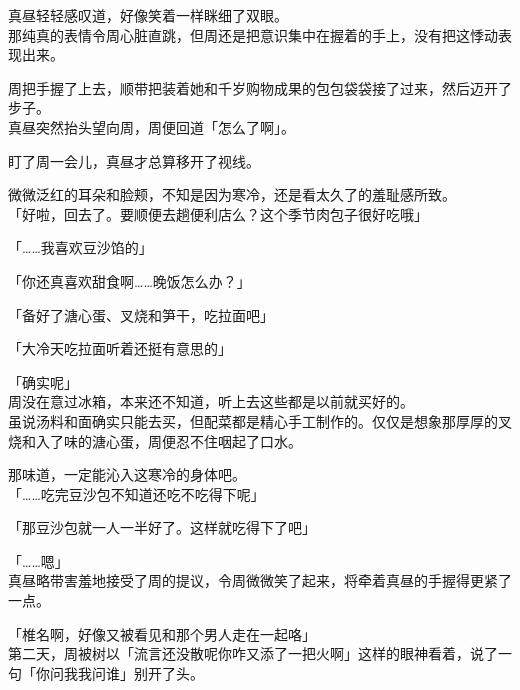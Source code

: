 真昼轻轻感叹道，好像笑着一样眯细了双眼。\\

那纯真的表情令周心脏直跳，但周还是把意识集中在握着的手上，没有把这悸动表现出来。

周把手握了上去，顺带把装着她和千岁购物成果的包包袋袋接了过来，然后迈开了步子。\\

真昼突然抬头望向周，周便回道「怎么了啊」。

盯了周一会儿，真昼才总算移开了视线。

微微泛红的耳朵和脸颊，不知是因为寒冷，还是看太久了的羞耻感所致。\\

「好啦，回去了。要顺便去趟便利店么？这个季节肉包子很好吃哦」

「……我喜欢豆沙馅的」

「你还真喜欢甜食啊……晚饭怎么办？」

「备好了溏心蛋、叉烧和笋干，吃拉面吧」

「大冷天吃拉面听着还挺有意思的」

「确实呢」\\

周没在意过冰箱，本来还不知道，听上去这些都是以前就买好的。\\

虽说汤料和面确实只能去买，但配菜都是精心手工制作的。仅仅是想象那厚厚的叉烧和入了味的溏心蛋，周便忍不住咽起了口水。

那味道，一定能沁入这寒冷的身体吧。\\

「……吃完豆沙包不知道还吃不吃得下呢」

「那豆沙包就一人一半好了。这样就吃得下了吧」

「……嗯」\\

真昼略带害羞地接受了周的提议，令周微微笑了起来，将牵着真昼的手握得更紧了一点。\\

\vspace{2\baselineskip}

「椎名啊，好像又被看见和那个男人走在一起咯」\\

第二天，周被树以「流言还没散呢你咋又添了一把火啊」这样的眼神看着，说了一句「你问我我问谁」别开了头。
